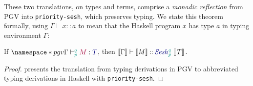 \documentclass[sigplan,screen]{acmart}
\newcommand{\Conid}[1]{\mathit{#1}}
\newcommand{\Varid}[1]{\mathit{#1}}
\begin{document}
These two translations, on types and terms, comprise a \emph{monadic reflection} from PGV into \texttt{priority-sesh}, which preserves typing. We state this theorem formally, using $\Gamma\vdash\ensuremath{\Varid{x}\mathbin{::}\Varid{a}}$ to mean that the Haskell program \ensuremath{\Varid{x}} has type \ensuremath{\Varid{a}} in typing environment \ensuremath{\Gamma}:
\begin{theorem}
  If $\pgv{\seq{p}{q}{\Gamma}{M}{T}}$, then $\ensuremath{\tosesh{\Gamma}}\vdash\ensuremath{\tosesh{\Conid{M}}\mathbin{::}\seshtymon{\Varid{p}}{\Varid{q}}\;\tosesh{\Conid{T}}}$.
\end{theorem}
\begin{proof}
   presents the translation from typing derivations in PGV to abbreviated typing derivations in Haskell with \texttt{priority-sesh}.
\end{proof}
\end{document}

